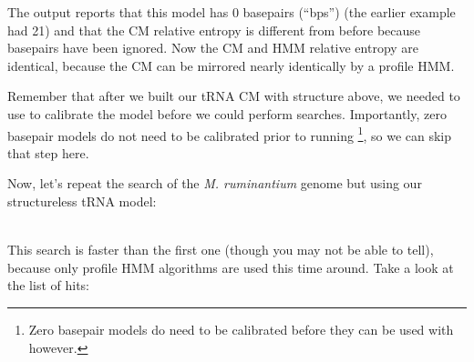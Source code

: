 The output reports that this model has 0 basepairs (``bps'') (the
earlier example had 21) and that the CM relative entropy is different
from before because basepairs have been ignored. Now the CM and HMM 
relative entropy are identical, because the CM can be mirrored nearly
identically by a profile HMM.

Remember that after we built our tRNA CM with structure above, we
needed to use  to calibrate the model before we
could perform searches. Importantly, zero basepair models do not need
to be calibrated prior to running \footnote{Zero
  basepair models do need to be calibrated before they can be used
  with  however.}, so we can skip that step here. 

Now, let's repeat the search of the \emph{M. ruminantium} genome but
using our structureless tRNA model: 

\\

This search is faster than the first one (though you may not be able
to tell), because only profile HMM algorithms are used this time
around. Take a look at the list of hits:

\newpage


